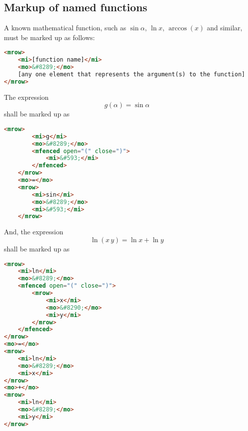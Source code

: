 \documentclass[english,a4paper,11pt]{article}
\begin{document}
\subsection{Markup of named functions}\label{named-functions}
A known mathematical function, such as $\sin \alpha$, $\ln x$, $\arccos(x)$ and similar, must be marked up as follows:
\begin{lstlisting}[language=HTML]
<mrow>
	<mi>[function name]</mi>
	<mo>&#8289;</mo>
	[any one element that represents the argument(s) to the function]
</mrow>
\end{lstlisting}


\begin{eksempler}
	The expression 
	\begin{equation}g(\alpha) = \sin \alpha\end{equation}
	shall be marked up as
	\begin{lstlisting}[language=HTML]
	<mrow>
		<mi>g</mi>
		<mo>&#8289;</mo>
		<mfenced open="(" close=")">
			<mi>&#593;</mi>
		</mfenced>
	</mrow>
	<mo>=</mo>
	<mrow>
		<mi>sin</mi>
		<mo>&#8289;</mo>
		<mi>&#593;</mi>
	</mrow>
	\end{lstlisting}

And, the expression 
\begin{equation}
\ln (x\, y) = \ln x + \ln y
\end{equation}
shall be marked up as
\begin{lstlisting}[language=HTML]
<mrow>
	<mi>ln</mi>
	<mo>&#8289;</mo>
	<mfenced open="(" close=")">
		<mrow>
			<mi>x</mi>
			<mo>&#8290;</mo>
			<mi>y</mi>
		</mrow>
	</mfenced>
</mrow>
<mo>=</mo>
<mrow>
	<mi>ln</mi>
	<mo>&#8289;</mo>
	<mi>x</mi>
</mrow>
<mo>+</mo>
<mrow>
	<mi>ln</mi>
	<mo>&#8289;</mo>
	<mi>y</mi>
</mrow>
\end{lstlisting}
\end{eksempler}
\end{document}
